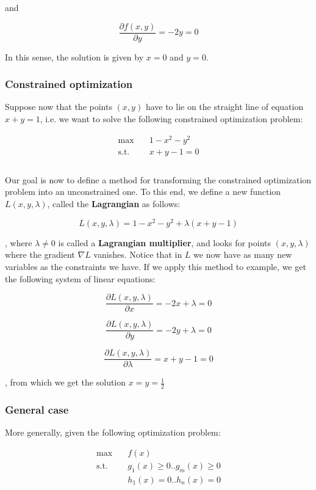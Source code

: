 and

$$
\frac{\partial f(x,y)}{\partial y} = -2y = 0
$$

In this sense, the solution is given by $x = 0$ and $y = 0$.

\subsubsection{Constrained optimization}
Suppose now that the points $(x,y)$ have to lie on the straight line of equation $x + y = 1$, i.e. we want to solve the following constrained optimization problem:

\begin{equation*}\label{eq_svm2}
\begin{aligned}
\max \quad & 1 - x^2 - y^2\\
\textrm{s.t.} \quad & x + y - 1 = 0\\ \\
\end{aligned}
\end{equation*}

Our goal is now to define a method for transforming the constrained optimization problem into an unconstrained one. To this end, we define a new function $L(x,y,\lambda)$, called the \textbf{Lagrangian} as follows:

$$
L(x,y,\lambda) = 1 - x^2 - y^2 + \lambda(x + y - 1)
$$

, where $\lambda \neq 0$ is called a \textbf{Lagrangian multiplier}, and looks for points $(x,y,\lambda)$ where the gradient $\nabla L$ vanishes. Notice that in $L$ we now have as many new variables as the constraints we have. If we apply this method to example, we get the following system of linear equations:

$$
\frac{\partial L(x,y,\lambda)}{\partial x} = -2x + \lambda = 0
$$

$$
\frac{\partial L(x,y,\lambda)}{\partial y} = -2y + \lambda = 0
$$

$$
\frac{\partial L(x,y,\lambda)}{\partial \lambda} = x + y - 1 = 0
$$

, from which we get the solution $x = y = \frac{1}{2}$

\subsubsection{General case}
More generally, given the following optimization problem:

\begin{equation*}\label{eq_svm2}
\begin{aligned}
\max \quad & f(x)\\
\textrm{s.t.} \quad & g_1(x) \geq 0 .. g_m(x) \geq 0  \\
\textrm{    } \quad & h_1(x) = 0 .. h_n(x) = 0
\end{aligned}
\end{equation*}

